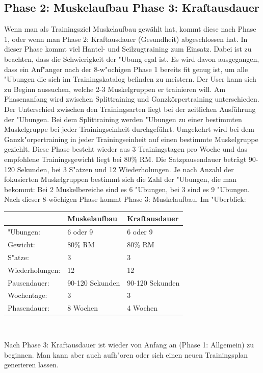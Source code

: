 \documentclass[FIPLY_base.tex]{subfiles}
\begin{document}
	\subsection{Phase 2: Muskelaufbau \newline Phase 3: Kraftausdauer}	
	Wenn man als Trainingsziel \grqq{}Muskelaufbau\grqq{} gewählt hat, kommt diese nach Phase 1, oder wenn man Phase 2: Kraftausdauer (Gesundheit) abgeschlossen hat. In dieser Phase kommt viel Hantel- und Seilzugtraining zum Einsatz. Dabei ist zu beachten, dass die Schwierigkeit der "Ubung egal ist. Es wird davon ausgegangen, dass ein Anf"anger nach der 8-w"ochigen Phase 1 bereits fit genug ist, um alle "Ubungen die sich im Trainingskatalog befinden zu meistern. 
	\newline
	Der User kann sich zu Beginn aussuchen, welche 2-3 Muskelgruppen er trainieren will. Am Phasenanfang wird zwischen Splittraining und Ganzkörpertraining unterschieden. Der Unterschied zwischen den Trainingsarten liegt bei der zeitlichen Ausführung der "Ubungen. Bei dem Splittraining werden "Ubungen zu einer bestimmten Muskelgruppe bei jeder Trainingseinheit durchgeführt. Umgekehrt wird bei dem Ganzk"orpertraining in jeder Trainingseinheit auf einen bestimmte Muskelgruppe geziehlt. 
	\newline
	Diese Phase besteht wieder aus 3 Trainingstagen pro Woche und das empfohlene Trainingsgewicht liegt bei 80\% RM. Die Satzpausendauer beträgt 90-120 Sekunden, bei 3 S"atzen und 12 Wiederholungen. Je nach Anzahl der fokusierten Muskelgruppen bestimmt sich die Zahl der "Ubungen, die man bekommt: Bei 2 Muskelbereiche sind es 6 "Ubungen, bei 3 sind es 9 "Ubungen. Nach dieser 8-wöchigen Phase kommt Phase 3: Muskelaufbau.
	\newline
	Im "Uberblick:
	\newline
	\begin{center}
		\begin{tabular}{| l || l | l |}
			\hline
			& Muskelaufbau & Kraftausdauer \\ \hline
			"Ubungen: & 6 oder 9 & 6 oder 9 \\ \hline 
			Gewicht: & 80\% RM & 80\% RM \\ \hline
			S"atze: & 3 & 3\\ \hline
			Wiederholungen: & 12 & 12\\ \hline
			Pausendauer: & 90-120 Sekunden & 90-120 Sekunden \\ \hline
			Wochentage: & 3 & 3\\ \hline
			Phasendauer: & 8 Wochen & 4 Wochen \\ \hline
		\end{tabular} \\
	\end{center}
	Nach Phase 3: Kraftausdauer ist wieder von Anfang an (Phase 1: Allgemein) zu beginnen. Man kann aber auch aufh"oren oder sich einen neuen Trainingsplan generieren lassen.
	
\end{document}
